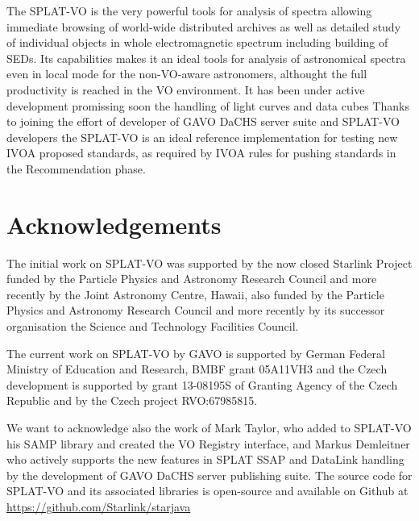 \documentclass[final,authoryear,5p,times,twocolumn]{elsarticle}
\begin{document}
The SPLAT-VO is the very powerful tools for analysis of spectra
allowing immediate browsing of world-wide distributed archives as well
as detailed study of individual objects in whole electromagnetic
spectrum including building of SEDs. Its capabilities makes it an
ideal tools for analysis of astronomical spectra even in local mode
for the non-VO-aware astronomers, althought the full productivity is
reached in the VO environment.  It has been under active development
promissing soon the handling of light curves and data cubes Thanks to
joining the effort of developer of GAVO DaCHS server suite and
SPLAT-VO developers the SPLAT-VO is an ideal reference implementation
for testing new IVOA proposed standards, as required by IVOA rules for
pushing standards in the Recommendation phase.

\section*{Acknowledgements}

The initial work on SPLAT-VO was supported
by the now closed Starlink Project funded by the Particle Physics and
Astronomy Research Council and more recently by the Joint Astronomy
Centre, Hawaii, also funded by the Particle Physics and Astronomy
Research Council and more recently by its successor organisation the
Science and Technology Facilities Council.

The current work on SPLAT-VO by GAVO is supported by German Federal
Ministry of Education and Research, BMBF grant 05A11VH3 and the Czech
development is supported by grant 13-08195S of Granting Agency of the
Czech Republic and by the Czech project RVO:67985815.

We want to acknowledge also the work of Mark Taylor, who added to
SPLAT-VO his SAMP library and created the VO Registry interface, and
Markus Demleitner who actively supports the new features in SPLAT SSAP
and DataLink handling by the development of GAVO DaCHS server publishing suite.
The source code for SPLAT-VO and its associated libraries is
open-source and available on Github at
\url{https://github.com/Starlink/starjava}



\end{document}
